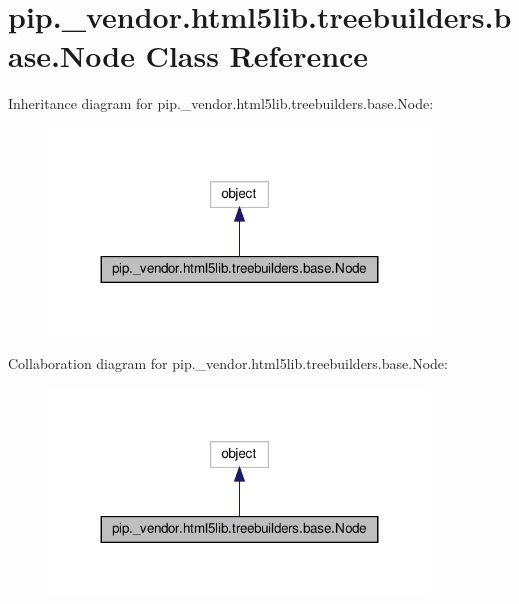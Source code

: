 \hypertarget{classpip_1_1__vendor_1_1html5lib_1_1treebuilders_1_1base_1_1Node}{}\section{pip.\+\_\+vendor.\+html5lib.\+treebuilders.\+base.\+Node Class Reference}
\label{classpip_1_1__vendor_1_1html5lib_1_1treebuilders_1_1base_1_1Node}


Inheritance diagram for pip.\+\_\+vendor.\+html5lib.\+treebuilders.\+base.\+Node\+:
\nopagebreak
\begin{figure}[H]
\begin{center}
\leavevmode
\includegraphics[width=287pt]{classpip_1_1__vendor_1_1html5lib_1_1treebuilders_1_1base_1_1Node__inherit__graph}
\end{center}
\end{figure}


Collaboration diagram for pip.\+\_\+vendor.\+html5lib.\+treebuilders.\+base.\+Node\+:
\nopagebreak
\begin{figure}[H]
\begin{center}
\leavevmode
\includegraphics[width=287pt]{classpip_1_1__vendor_1_1html5lib_1_1treebuilders_1_1base_1_1Node__coll__graph}
\end{center}
\end{figure}
